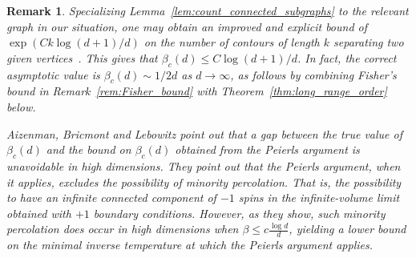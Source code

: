 \documentclass[12pt,reqno]{article}
\newtheorem{remark}[theorem]{Remark}
\begin{document}
\begin{remark}
Specializing Lemma~\ref{lem:count_connected_subgraphs} to the
relevant graph in our situation, one may obtain an improved and explicit bound of $\exp(C k \log (d+1)/d)$
on the number of contours of length $k$ separating two given
vertices~\cite{LebMaz98, BalBol07}. This gives that $\beta_c(d) \le
C \log(d+1)/d$. In fact, the correct asymptotic value is $\beta_c(d)
\sim 1/2d$ as $d\to\infty$, as follows by combining Fisher's bound in Remark~\ref{rem:Fisher_bound} with Theorem~\ref{thm:long_range_order} below.

Aizenman, Bricmont and Lebowitz \cite{aizenman1987percolation} point out that a gap between the true value of $\beta_c(d)$ and the bound on $\beta_c(d)$ obtained from the Peierls argument is unavoidable in high dimensions. They point out that the Peierls argument, when it applies, excludes the possibility of  \emph{minority percolation}. That is, the possibility to have an infinite connected component of $-1$ spins in the infinite-volume limit obtained with $+1$ boundary conditions. However, as they show, such minority percolation does occur in high dimensions when $\beta\le c\frac{\log d}{d}$, yielding a lower bound on the minimal inverse temperature at which the Peierls argument applies.
\end{remark}
\end{document}
